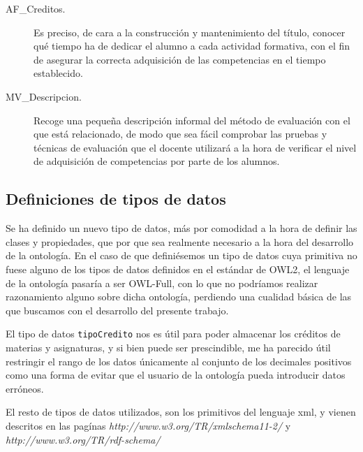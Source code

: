 \begin{description}
		\item [AF\_Creditos.] Es preciso, de cara a la construcción y mantenimiento del título, conocer qué tiempo ha de dedicar el alumno a cada actividad formativa, con el fin de asegurar la correcta adquisición de las competencias en el tiempo establecido.			
		   

		\item [MV\_Descripcion.] Recoge una pequeña descripción informal del método de evaluación con el que está relacionado, de modo que sea fácil comprobar las pruebas y técnicas de evaluación que el docente utilizará a la hora de verificar el nivel de adquisición de competencias por parte de los alumnos.
   		 
	\end{description}
  
\subsection{Definiciones de tipos de datos}
Se ha definido un nuevo tipo de datos, más por comodidad a la hora de definir las clases y propiedades, que por que sea realmente necesario a la hora del desarrollo de la ontología. En el caso de que definiésemos un tipo de datos cuya primitiva no fuese alguno de los tipos de datos definidos en el estándar de OWL2, el lenguaje de la ontología pasaría a ser OWL-Full, con lo que no podríamos realizar razonamiento alguno sobre dicha ontología, perdiendo una cualidad básica de las que buscamos con el desarrollo del presente trabajo.

El tipo de datos \lstinline!tipoCredito! nos es útil para poder almacenar los créditos de materias y asignaturas, y si bien puede ser prescindible, me ha parecido útil restringir el rango de los datos únicamente al conjunto de los decimales positivos como una forma de evitar que el usuario de la ontología pueda introducir datos erróneos.

El resto de tipos de datos utilizados, son los primitivos del lenguaje xml, y vienen descritos en las pagínas \textsl{http://www.w3.org/TR/xmlschema11-2/} y \textsl{http://www.w3.org/TR/rdf-schema/}

